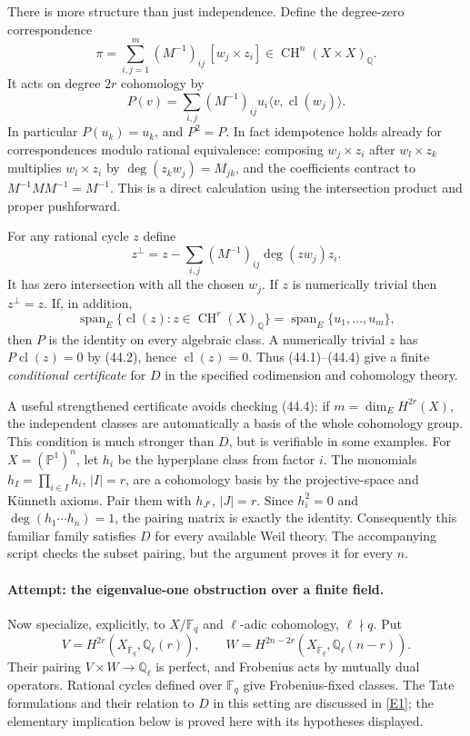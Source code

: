 \documentclass[11pt,a4paper]{article}
\newcommand{\Q}{\mathbb{Q}}
\newcommand{\F}{\mathbb{F}}
\newcommand{\PP}{\mathbb P}
\newcommand{\eref}[2]{\hyperlink{extra:#1:#2}{[E#2]}}
\numberwithin{equation}{section}
\begin{document}
There is more structure than just independence. Define the degree-zero
correspondence
\[
 \pi=\sum_{i,j=1}^m(M^{-1})_{ij}\,[w_j\times z_i]
          \in\operatorname{CH}^{n}(X\times X)_{\Q}. \tag{44.1}
\]
It acts on degree $2r$ cohomology by
\[
 P(v)=\sum_{i,j}(M^{-1})_{ij}u_i\langle v,\operatorname{cl}(w_j)\rangle.
 \tag{44.2}
\]
In particular $P(u_k)=u_k$, and $P^2=P$. In fact idempotence holds
already for correspondences modulo rational equivalence: composing
$w_j\times z_i$ after $w_l\times z_k$ multiplies $w_l\times z_i$
by $\deg(z_kw_j)=M_{jk}$, and the coefficients contract to
$M^{-1}MM^{-1}=M^{-1}$. This is a direct calculation using the
intersection product and proper pushforward.

For any rational cycle $z$ define
\[
 z^\perp=z-\sum_{i,j}(M^{-1})_{ij}\deg(zw_j)z_i.
 \tag{44.3}
\]
It has zero intersection with all the chosen $w_j$. If $z$ is numerically
trivial then $z^\perp=z$. If, in addition,
\[
 \operatorname{span}_E\{\operatorname{cl}(z):z\in
          \operatorname{CH}^r(X)_{\Q}\}
       =\operatorname{span}_E\{u_1,\ldots,u_m\}, \tag{44.4}
\]
then $P$ is the identity on every algebraic class. A numerically trivial
$z$ has $P\operatorname{cl}(z)=0$ by (44.2), hence
$\operatorname{cl}(z)=0$. Thus (44.1)--(44.4) give a finite
\emph{conditional certificate} for $D$ in the specified codimension
and cohomology theory.

A useful strengthened certificate avoids checking (44.4): if
$m=\dim_E H^{2r}(X)$, the independent classes are automatically a basis
of the whole cohomology group. This condition is much stronger than $D$,
but is verifiable in some examples. For $X=(\PP^1)^n$, let $h_i$ be the
hyperplane class from factor $i$. The monomials $h_I=\prod_{i\in I}h_i$,
$|I|=r$, are a cohomology basis by the projective-space and K\"unneth
axioms. Pair them with $h_{J^c}$, $|J|=r$. Since $h_i^2=0$ and
$\deg(h_1\cdots h_n)=1$, the pairing matrix is exactly the identity.
Consequently this familiar family satisfies $D$ for every available
Weil theory. The accompanying script checks the subset pairing, but the
argument proves it for every $n$.

\paragraph{Attempt: the eigenvalue-one obstruction over a finite field.}
Now specialize, explicitly, to $X/\F_q$ and $\ell$-adic cohomology,
$\ell\nmid q$. Put
\[
 V=H^{2r}(X_{\overline{\F}_q},\Q_\ell(r)),\qquad
 W=H^{2n-2r}(X_{\overline{\F}_q},\Q_\ell(n-r)).
\]
Their pairing $V\times W\to\Q_\ell$ is perfect, and Frobenius acts by
mutually dual operators. Rational cycles defined over $\F_q$ give
Frobenius-fixed classes. The Tate formulations and their relation to
$D$ in this setting are discussed in \eref{44}{1}; the elementary
implication below is proved here with its hypotheses displayed.
\end{document}
